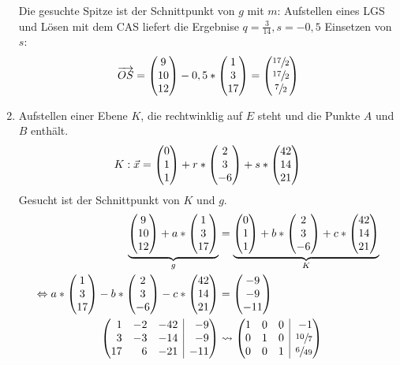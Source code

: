 \begin{lsg}{}
\begin{enumerate}
\begin{equation*}
		\end{equation*}
		Die gesuchte Spitze ist der Schnittpunkt von $g$ mit $m$:
		Aufstellen eines LGS und Lösen mit dem CAS liefert die Ergebnise $q=\frac 3{14}, s=-0,5$
		Einsetzen von $s$:
		\begin{equation*}
			\overrightarrow{OS}=\begin{pmatrix} 9\\10\\12 \end{pmatrix}-0,5*\begin{pmatrix} 1\\3\\17 \end{pmatrix}=\begin{pmatrix} \sfrac{17}2\\\sfrac{17}2\\\sfrac{7}2 \end{pmatrix}
		\end{equation*}
		\item Aufstellen einer Ebene $K$, die rechtwinklig auf $E$ steht und die Punkte $A$ und $B$ enthält.
		\begin{equation*}
			K: \vec x=\begin{pmatrix} 0\\1\\1 \end{pmatrix}+r*\begin{pmatrix} 2\\3\\-6 \end{pmatrix}+s*\begin{pmatrix} 42\\14\\21 \end{pmatrix}
		\end{equation*}
		Gesucht ist der Schnittpunkt von $K$ und $g$.
		\begin{align*}
			\underbrace{\vektor{9\\10\\12}+a*\vektor{1\\3\\17}}_g&=\underbrace{\vektor{0\\1\\1}+b*\vektor{2\\3\\-6}+c*\vektor{42\\14\\21}}_K\\
			\Leftrightarrow a*\vektor{1\\3\\17}-b*\vektor{2\\3\\-6}-c*\vektor{42\\14\\21}&=\vektor{-9\\-9\\-11}\\
			\ematrix{rrr|r}{1&-2&-42&-9\\3&-3&-14&-9\\17&6&-21&-11}&\rightsquigarrow\ematrix{rrr|r}{1&0&0&-1\\0&1&0&\sfrac{10}7\\0&0&1&\sfrac6{49}}

\end{align*}
\end{enumerate}
\end{lsg}
